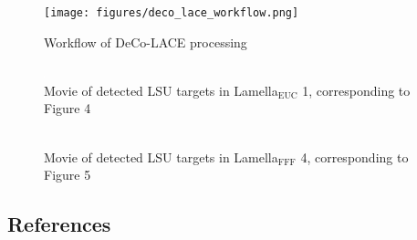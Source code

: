 \documentclass[
]{article}
\newenvironment{fignos:tagged-figure}[1][]{
    \let\oldthefigure\thefigure
    \let\oldtheHfigure\theHfigure
    \renewcommand{\thefigure}{#1}
    \renewcommand{\theHfigure}{#1}
  }{
    \let\thefigure\oldthefigure
    \let\theHfigure\oldtheHfigure
    \addtocounter{figure}{-1}
  }
\begin{document}
\begin{figure}
\hypertarget{fig:deco_lace_workflow}{%
\centering
\texttt{[image: figures/deco\_lace\_workflow.png]}
\caption{Workflow of DeCo-LACE
processing}\label{fig:deco_lace_workflow}
}
\end{figure}

\begin{fignos:tagged-figure}

\begin{figure}
\hypertarget{fig:movie1}{%
\centering
\includegraphics{images/1x1-00000000.png}
\caption{Movie of detected LSU targets in Lamella\(_\textrm{EUC}\) 1,
corresponding to Figure 4}\label{fig:movie1}
}
\end{figure}

\end{fignos:tagged-figure}

\begin{fignos:tagged-figure}

\begin{figure}
\hypertarget{fig:movie2}{%
\centering
\includegraphics{images/1x1-00000000.png}
\caption{Movie of detected LSU targets in Lamella\(_\textrm{FFF}\) 4,
corresponding to Figure 5}\label{fig:movie2}
}
\end{figure}

\end{fignos:tagged-figure}

\hypertarget{references}{%
\subsection{References}\label{references}}
\end{document}
